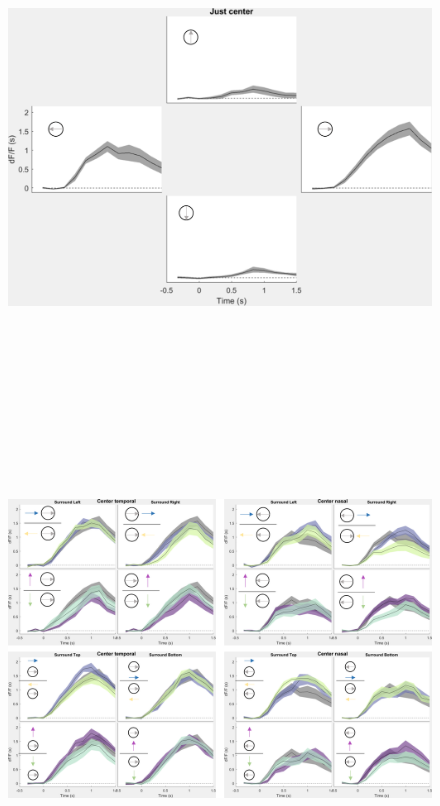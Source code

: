 \begin{figure}[H] \centering \includegraphics[width=12.5cm,height=12.5cm,keepaspectratio]{Figures/7.Results/individualSM/roi 46 mf379 pos2/center.png} 
\end{figure}

\begin{figure}[H] \centering \includegraphics[width=12.5cm,height=12.5cm,keepaspectratio]{Figures/7.Results/individualSM/roi 46 mf379 pos2/surrs.png} 
\end{figure}


